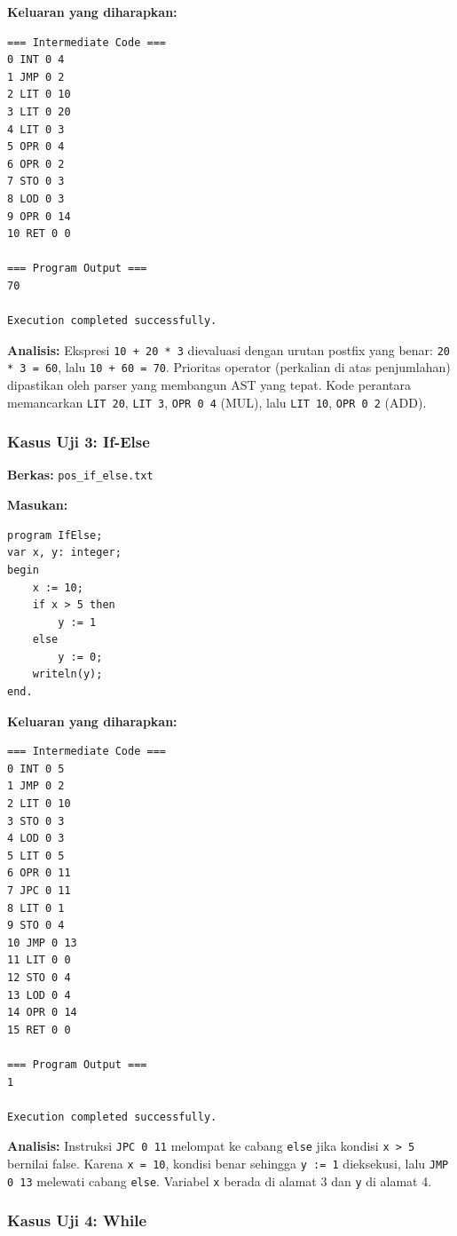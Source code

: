 \documentclass[12pt,a4paper]{article}
\begin{document}
\textbf{Keluaran yang diharapkan:}
\begin{verbatim}
=== Intermediate Code ===
0 INT 0 4
1 JMP 0 2
2 LIT 0 10
3 LIT 0 20
4 LIT 0 3
5 OPR 0 4
6 OPR 0 2
7 STO 0 3
8 LOD 0 3
9 OPR 0 14
10 RET 0 0

=== Program Output ===
70

Execution completed successfully.
\end{verbatim}

\textbf{Analisis:} Ekspresi \texttt{10 + 20 * 3} dievaluasi dengan urutan postfix yang benar: \texttt{20 * 3 = 60}, lalu \texttt{10 + 60 = 70}. Prioritas operator (perkalian di atas penjumlahan) dipastikan oleh parser yang membangun AST yang tepat. Kode perantara memancarkan \texttt{LIT 20}, \texttt{LIT 3}, \texttt{OPR 0 4} (MUL), lalu \texttt{LIT 10}, \texttt{OPR 0 2} (ADD).

\subsubsection{Kasus Uji 3: If-Else}

\textbf{Berkas:} \texttt{pos\_if\_else.txt}

\textbf{Masukan:}
\begin{lstlisting}
program IfElse;
var x, y: integer;
begin
    x := 10;
    if x > 5 then
        y := 1
    else
        y := 0;
    writeln(y);
end.
\end{lstlisting}

\textbf{Keluaran yang diharapkan:}
\begin{verbatim}
=== Intermediate Code ===
0 INT 0 5
1 JMP 0 2
2 LIT 0 10
3 STO 0 3
4 LOD 0 3
5 LIT 0 5
6 OPR 0 11
7 JPC 0 11
8 LIT 0 1
9 STO 0 4
10 JMP 0 13
11 LIT 0 0
12 STO 0 4
13 LOD 0 4
14 OPR 0 14
15 RET 0 0

=== Program Output ===
1

Execution completed successfully.
\end{verbatim}

\textbf{Analisis:} Instruksi \texttt{JPC 0 11} melompat ke cabang \texttt{else} jika kondisi \texttt{x > 5} bernilai false. Karena \texttt{x = 10}, kondisi benar sehingga \texttt{y := 1} dieksekusi, lalu \texttt{JMP 0 13} melewati cabang \texttt{else}. Variabel \texttt{x} berada di alamat 3 dan \texttt{y} di alamat 4.

\subsubsection{Kasus Uji 4: While}
\end{document}
